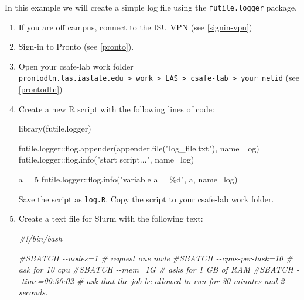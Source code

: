 \documentclass[
]{book}
\newenvironment{Shaded}{\begin{snugshade}}{\end{snugshade}}
\newcommand{\AttributeTok}[1]{\textcolor[rgb]{0.77,0.63,0.00}{#1}}
\newcommand{\CommentTok}[1]{\textcolor[rgb]{0.56,0.35,0.01}{\textit{#1}}}
\newcommand{\DecValTok}[1]{\textcolor[rgb]{0.00,0.00,0.81}{#1}}
\newcommand{\FunctionTok}[1]{\textcolor[rgb]{0.00,0.00,0.00}{#1}}
\newcommand{\NormalTok}[1]{#1}
\newcommand{\OtherTok}[1]{\textcolor[rgb]{0.56,0.35,0.01}{#1}}
\newcommand{\SpecialCharTok}[1]{\textcolor[rgb]{0.00,0.00,0.00}{#1}}
\newcommand{\StringTok}[1]{\textcolor[rgb]{0.31,0.60,0.02}{#1}}
\begin{document}
In this example we will create a simple log file using the \texttt{futile.logger} package.

\begin{enumerate}
\def\labelenumi{\arabic{enumi}.}
\item
  If you are off campus, connect to the ISU VPN (see \ref{signin-vpn})
\item
  Sign-in to Pronto (see \ref{pronto}).
\item
  Open your csafe-lab work folder \texttt{prontodtn.las.iastate.edu\ \textgreater{}\ work\ \textgreater{}\ LAS\ \textgreater{}\ csafe-lab\ \textgreater{}\ your\_netid} (see \ref{prontodtn})
\item
  Create a new R script with the following lines of code:

\begin{Shaded}
\begin{Highlighting}[]
\FunctionTok{library}\NormalTok{(futile.logger)}

\NormalTok{futile.logger}\SpecialCharTok{::}\FunctionTok{flog.appender}\NormalTok{(}\FunctionTok{appender.file}\NormalTok{(}\StringTok{"log\_file.txt"}\NormalTok{), }\AttributeTok{name=}\StringTok{\textquotesingle{}log\textquotesingle{}}\NormalTok{)}
\NormalTok{futile.logger}\SpecialCharTok{::}\FunctionTok{flog.info}\NormalTok{(}\StringTok{"start script..."}\NormalTok{, }\AttributeTok{name=}\StringTok{\textquotesingle{}log\textquotesingle{}}\NormalTok{)}

\NormalTok{a }\OtherTok{=} \DecValTok{5}
\NormalTok{futile.logger}\SpecialCharTok{::}\FunctionTok{flog.info}\NormalTok{(}\StringTok{"variable a = \%d"}\NormalTok{, a, }\AttributeTok{name=}\StringTok{\textquotesingle{}log\textquotesingle{}}\NormalTok{)}
\end{Highlighting}
\end{Shaded}

  Save the script as \texttt{log.R}. Copy the script to your csafe-lab work folder.
\item
  Create a text file for Slurm with the following text:

\begin{Shaded}
\begin{Highlighting}[]
\CommentTok{\#!/bin/bash}

\CommentTok{\#SBATCH {-}{-}nodes=1 \# request one node}
\CommentTok{\#SBATCH {-}{-}cpus{-}per{-}task=10  \# ask for 10 cpu}
\CommentTok{\#SBATCH {-}{-}mem=1G \#  asks for 1 GB of RAM}
\CommentTok{\#SBATCH {-}{-}time=00:30:02 \# ask that the job be allowed to run for 30 minutes and 2 seconds.}


\end{Highlighting}
\end{Shaded}
\end{enumerate}
\end{document}
